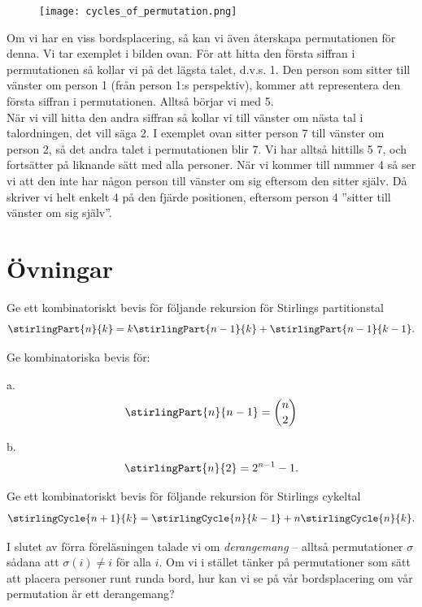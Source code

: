 \documentclass[nobib]{tufte-handout}
\begin{document}
\begin{remark}
    \begin{figure}[h]
\texttt{[image: cycles\_of\_permutation.png]}
\end{figure}
Om vi har en viss bordsplacering, så kan vi även återskapa permutationen för denna. Vi tar exemplet i bilden ovan. För att hitta den första siffran i permutationen så kollar vi på det lägsta talet, d.v.s. 1. Den person som sitter till vänster om person 1 (från person 1:s perspektiv), kommer att representera den första siffran i permutationen. Alltså börjar vi med 5.\\
När vi vill hitta den andra siffran så kollar vi till vänster om nästa tal i talordningen, det vill säga 2. I exemplet ovan sitter person 7 till vänster om person 2, så det andra talet i permutationen blir 7. Vi har alltså hittills 5 7, och fortsätter på liknande sätt med alla personer. När vi kommer till nummer 4 så ser vi att den inte har någon person till vänster om sig eftersom den sitter själv. Då skriver vi helt enkelt 4 på den fjärde positionen, eftersom person 4 ''sitter till vänster om sig själv''.
\end{remark}

\section{Övningar}

\begin{xca}
  Ge ett kombinatoriskt bevis för följande rekursion för Stirlings partitionstal
  $$\stirlingPart{n}{k} = k\stirlingPart{n-1}{k} + \stirlingPart{n-1}{k-1}.$$
\end{xca}

\begin{xca}
  Ge kombinatoriska bevis för:\\ \bigskip 
  
  a. $$\stirlingPart{n}{n-1} = \binom{n}{2}$$
  
  b. $$\stirlingPart{n}{2} = 2^{n-1} - 1.$$
\end{xca}

\begin{xca}
  Ge ett kombinatoriskt bevis för följande rekursion för Stirlings cykeltal
  $$\stirlingCycle{n+1}{k} = \stirlingCycle{n}{k-1} + n\stirlingCycle{n}{k}.$$
\end{xca}

\begin{xca}
  I slutet av förra föreläsningen talade vi om \emph{derangemang} -- alltså permutationer $\sigma$ sådana att $\sigma(i) \neq i$ för alla $i$. Om vi i stället tänker på permutationer som sätt att placera personer runt runda bord, hur kan vi se på vår bordsplacering om vår permutation är ett derangemang?
\end{xca}
\end{document}
